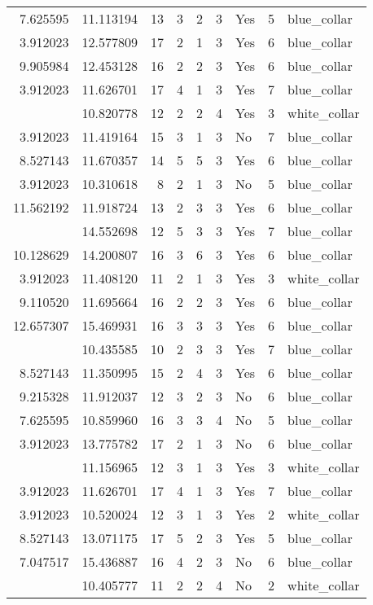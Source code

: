 \documentclass[
]{article}
\begin{document}
\begin{longtable}[t]{rrrrrllrl}
7.625595 & 11.113194 & 13 & 3 & 2 & 3 & Yes & 5 & blue\_collar\\
3.912023 & 12.577809 & 17 & 2 & 1 & 3 & Yes & 6 & blue\_collar\\
9.905984 & 12.453128 & 16 & 2 & 2 & 3 & Yes & 6 & blue\_collar\\
3.912023 & 11.626701 & 17 & 4 & 1 & 3 & Yes & 7 & blue\_collar\\
\addlinespace
5.857933 & 10.820778 & 12 & 2 & 2 & 4 & Yes & 3 & white\_collar\\
3.912023 & 11.419164 & 15 & 3 & 1 & 3 & No & 7 & blue\_collar\\
8.527143 & 11.670357 & 14 & 5 & 5 & 3 & Yes & 6 & blue\_collar\\
3.912023 & 10.310618 & 8 & 2 & 1 & 3 & No & 5 & blue\_collar\\
11.562192 & 11.918724 & 13 & 2 & 3 & 3 & Yes & 6 & blue\_collar\\
\addlinespace
15.101998 & 14.552698 & 12 & 5 & 3 & 3 & Yes & 7 & blue\_collar\\
10.128629 & 14.200807 & 16 & 3 & 6 & 3 & Yes & 6 & blue\_collar\\
3.912023 & 11.408120 & 11 & 2 & 1 & 3 & Yes & 3 & white\_collar\\
9.110520 & 11.695664 & 16 & 2 & 2 & 3 & Yes & 6 & blue\_collar\\
12.657307 & 15.469931 & 16 & 3 & 3 & 3 & Yes & 6 & blue\_collar\\
\addlinespace
5.521461 & 10.435585 & 10 & 2 & 3 & 3 & Yes & 7 & blue\_collar\\
8.527143 & 11.350995 & 15 & 2 & 4 & 3 & Yes & 6 & blue\_collar\\
9.215328 & 11.912037 & 12 & 3 & 2 & 3 & No & 6 & blue\_collar\\
7.625595 & 10.859960 & 16 & 3 & 3 & 4 & No & 5 & blue\_collar\\
3.912023 & 13.775782 & 17 & 2 & 1 & 3 & No & 6 & blue\_collar\\
\addlinespace
3.912023 & 11.156965 & 12 & 3 & 1 & 3 & Yes & 3 & white\_collar\\
3.912023 & 11.626701 & 17 & 4 & 1 & 3 & Yes & 7 & blue\_collar\\
3.912023 & 10.520024 & 12 & 3 & 1 & 3 & Yes & 2 & white\_collar\\
8.527143 & 13.071175 & 17 & 5 & 2 & 3 & Yes & 5 & blue\_collar\\
7.047517 & 15.436887 & 16 & 4 & 2 & 3 & No & 6 & blue\_collar\\
\addlinespace
3.912023 & 10.405777 & 11 & 2 & 2 & 4 & No & 2 & white\_collar\\

\end{longtable}
\end{document}
